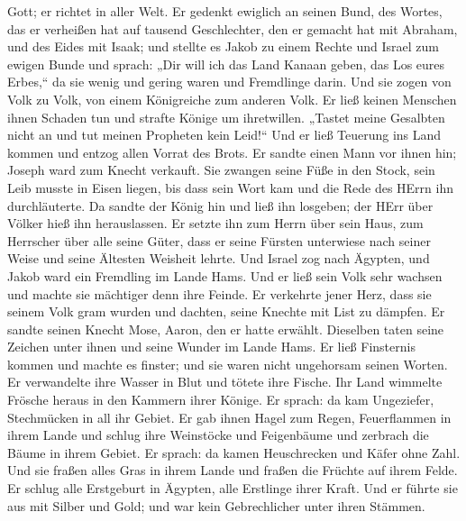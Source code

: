 Gott; er richtet in aller Welt.  Er gedenkt ewiglich an
seinen Bund, des Wortes, das er verheißen hat auf tausend Geschlechter,
 den er gemacht hat mit Abraham, und des Eides mit Isaak;
 und stellte es Jakob zu einem Rechte und Israel zum ewigen
Bunde  und sprach: „Dir will ich das Land Kanaan geben, das
Los eures Erbes,``  da sie wenig und gering waren und
Fremdlinge darin.  Und sie zogen von Volk zu Volk, von
einem Königreiche zum anderen Volk.  Er ließ keinen
Menschen ihnen Schaden tun und strafte Könige um ihretwillen.
 „Tastet meine Gesalbten nicht an und tut meinen Propheten
kein Leid!{}``  Und er ließ Teuerung ins Land kommen und
entzog allen Vorrat des Brots.  Er sandte einen Mann vor
ihnen hin; Joseph ward zum Knecht verkauft.  Sie zwangen
seine Füße in den Stock, sein Leib musste in Eisen liegen, 
bis dass sein Wort kam und die Rede des HErrn ihn durchläuterte.
 Da sandte der König hin und ließ ihn losgeben; der HErr
über Völker hieß ihn herauslassen.  Er setzte ihn zum Herrn
über sein Haus, zum Herrscher über alle seine Güter,  dass
er seine Fürsten unterwiese nach seiner Weise und seine Ältesten
Weisheit lehrte.  Und Israel zog nach Ägypten, und Jakob
ward ein Fremdling im Lande Hams.  Und er ließ sein Volk
sehr wachsen und machte sie mächtiger denn ihre Feinde.  Er
verkehrte jener Herz, dass sie seinem Volk gram wurden und dachten,
seine Knechte mit List zu dämpfen.  Er sandte seinen Knecht
Mose, Aaron, den er hatte erwählt.  Dieselben taten seine
Zeichen unter ihnen und seine Wunder im Lande Hams.  Er
ließ Finsternis kommen und machte es finster; und sie waren nicht
ungehorsam seinen Worten.  Er verwandelte ihre Wasser in
Blut und tötete ihre Fische.  Ihr Land wimmelte Frösche
heraus in den Kammern ihrer Könige.  Er sprach: da kam
Ungeziefer, Stechmücken in all ihr Gebiet.  Er gab ihnen
Hagel zum Regen, Feuerflammen in ihrem Lande  und schlug
ihre Weinstöcke und Feigenbäume und zerbrach die Bäume in ihrem Gebiet.
 Er sprach: da kamen Heuschrecken und Käfer ohne Zahl.
 Und sie fraßen alles Gras in ihrem Lande und fraßen die
Früchte auf ihrem Felde.  Er schlug alle Erstgeburt in
Ägypten, alle Erstlinge ihrer Kraft.  Und er führte sie aus
mit Silber und Gold; und war kein Gebrechlicher unter ihren Stämmen.
